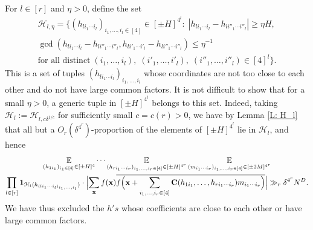 \documentclass[11pt]{amsart}
\theoremstyle{definition}
\DeclareMathOperator*{\E}{\mathbb{E}}
\newcommand{\CH}{{\mathcal H}}
\newcommand{\bc}{{\textbf{C}}}
\newcommand{\bx}{{\textbf{x}}}
\newcommand{\inv}{^{-1}}
\newcommand{\Bigabs}[1]{\Bigl| #1 \Bigr|}
\newcommand{\Bigbrac}[1]{\Bigl( #1 \Bigr)}
\begin{document}
For $l\in[r]$ and $\eta>0$, define the set
\begin{multline*}
    \CH_{l,\eta} = \{(h_{li_1\cdots i_l})_{i_1, \ldots, i_l\in[4]}\in[\pm H]^{4^l}:\; |h_{li_1\cdots i_l}-h_{li''_1\cdots i''_l}|\geq \eta H,\\ \gcd(h_{li_1\cdots i_l}-h_{li''_1\cdots i''_l}, h_{li'_1\cdots i'_l}-h_{li''_1\cdots i''_l})\leq \eta\inv\\
    \textrm{for {all} distinct}\; (i_1, \ldots, i_l),\; (i'_1, \ldots, i'_l),\; (i''_1, \ldots, i''_l)\in[4]^l\}.
\end{multline*}
This is a set of tuples $(h_{li_1\cdots i_l})_{i_1, \ldots, i_l}$ whose coordinates are not too close to each other and do not have large common factors. It is not difficult to show that for a small $\eta>0$, a generic tuple in $[\pm H]^{4^l}$ belongs to this set.
Indeed, taking $\CH_l := \CH_{l,c\delta^{1/c}}$ for sufficiently small $c= c(r)>0$, we have by Lemma \ref{L: H_l} that all but a $O_r(\delta^{4^r})$-proportion of the elements of $[\pm H]^{4^l}$ lie in $\CH_l$, and hence
\begin{multline*}
    \E_{(h_{1i_1})_{i_1\in [4]}\in[\pm H]^4}
    \cdots \E_{(h_{ri_1\cdots i_r})_{i_1, \ldots,  i_r\in [4]}\in[\pm H]^{4^r}}\E_{(m_{i_1\cdots  i_r})_{i_1, \ldots, i_r\in[4]}\in[\pm 2M]^{4^r}}\\
    \prod_{l\in[r]}\mathbf{1}_{\CH_l(h_{(li_1\cdots i_l)_{i_1, \ldots, i_l}})}\cdot\Bigabs{\sum_\bx f(\bx)\overline{f\Bigbrac{\bx+\sum_{\substack{i_1,\ldots, i_r\in[4]}}\bc(h_{1i_1}, \ldots, h_{ri_1\cdots  i_r})m_{i_1\cdots  i_r}}}}\gg_r \delta^{4^r} N^D.
\end{multline*}
We have thus excluded the $h's$ whose coefficients are close to each other or have large common factors.
\end{document}
